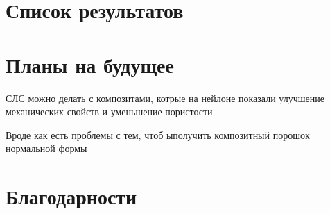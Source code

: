 \section{Список результатов}
\section{Планы на будущее}
СЛС можно делать с композитами, котрые на нейлоне показали улучшение механических свойств и уменьшение пористости
\cite{sls-composite}

Вроде как есть проблемы с тем, чтоб ыполучить композитный порошок нормальной формы \cite{sls-powder-problem}



\section{Благодарности}
